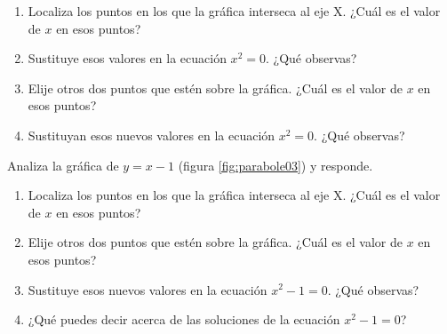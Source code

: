 \documentclass[11pt]{book}
\begin{document}
\begin{enumerate}
\begin{enumerate}
\begin{minipage}[t]{0.6\textwidth}
            \begin{enumerate}
              \item Localiza los puntos en los que la gráfica interseca al eje X. ¿Cuál
                    es el valor de $x$ en esos puntos?
              \item Sustituye esos valores en la ecuación $x^2= 0$. ¿Qué observas?
              \item Elije otros dos puntos que estén sobre la gráfica. ¿Cuál es el valor de $x$ en esos puntos?
              \item Sustituyan esos nuevos valores en la ecuación $x^2= 0$. ¿Qué observas?
            \end{enumerate}
          \end{minipage}

          \begin{minipage}[t]{0.6\textwidth}
            \item Analiza la gráfica de $y = x - 1$ (figura \ref{fig:parabole03}) y responde.
            \begin{enumerate}
              \item Localiza los puntos en los que la gráfica interseca al eje X. ¿Cuál es el valor de $x$ en esos puntos?
              \item Elije otros dos puntos que estén sobre la gráfica. ¿Cuál es el valor de $x$ en esos puntos?
              \item Sustituye esos nuevos valores en la ecuación $x^2 - 1 = 0$. ¿Qué observas?
              \item ¿Qué puedes decir acerca de las soluciones de la ecuación $x^2 - 1 = 0$?
            \end{enumerate}
          \end{minipage}\hfill
          \begin{minipage}[t]{0.3\textwidth}
            \begin{figure}[H]
              \centering

\end{figure}
\end{minipage}
\end{enumerate}
\end{enumerate}
\end{document}
